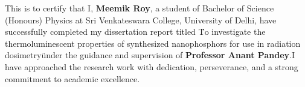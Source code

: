 \documentclass[../Report.tex]{subfiles}
\begin{document}
    \vspace{1cm}
    \large
    This is to certify that I, \textbf{Meemik Roy}, a student of Bachelor of Science (Honours) Physics
    at Sri Venkateswara College, University of Delhi, have successfully completed my dissertation report 
    titled \"To investigate the thermoluminescent properties of synthesized nanophosphors for use in radiation 
    dosimetry\" under the guidance and supervision of \textbf{Professor Anant Pandey}.I have approached the 
    research work with dedication, perseverance, and a strong commitment to academic excellence.
    
\end{document}
